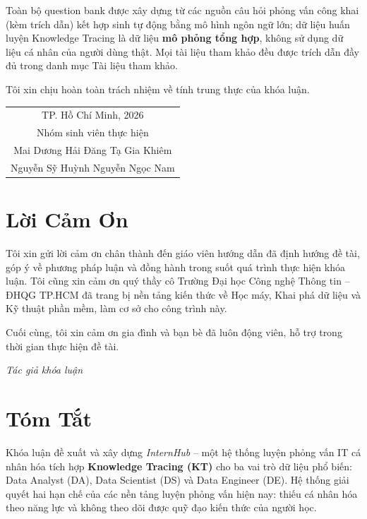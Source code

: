 \documentclass[12pt, a4paper]{report}
\newcommand{\system}{\textit{InternHub}}
\begin{document}
Toàn bộ question bank được xây dựng từ các nguồn câu hỏi phỏng vấn công khai (kèm trích dẫn) kết hợp sinh tự động bằng mô hình ngôn ngữ lớn; dữ liệu huấn luyện Knowledge Tracing là dữ liệu \textbf{mô phỏng tổng hợp}, không sử dụng dữ liệu cá nhân của người dùng thật. Mọi tài liệu tham khảo đều được trích dẫn đầy đủ trong danh mục Tài liệu tham khảo.

Tôi xin chịu hoàn toàn trách nhiệm về tính trung thực của khóa luận.

\vspace{1.5cm}
\hfill\begin{tabular}{c}
TP. Hồ Chí Minh, 2026 \\
Nhóm sinh viên thực hiện \\[2.5cm]
Mai Dương Hải Đăng \quad Tạ Gia Khiêm \\
Nguyễn Sỹ Huỳnh \quad Nguyễn Ngọc Nam \\
\end{tabular}

\chapter*{Lời Cảm Ơn}

Tôi xin gửi lời cảm ơn chân thành đến giáo viên hướng dẫn đã định hướng đề tài, góp ý về phương pháp luận và đồng hành trong suốt quá trình thực hiện khóa luận. Tôi cũng xin cảm ơn quý thầy cô Trường Đại học Công nghệ Thông tin -- ĐHQG TP.HCM đã trang bị nền tảng kiến thức về Học máy, Khai phá dữ liệu và Kỹ thuật phần mềm, làm cơ sở cho công trình này.

Cuối cùng, tôi xin cảm ơn gia đình và bạn bè đã luôn động viên, hỗ trợ trong thời gian thực hiện đề tài.

\vspace{0.5cm}
\hfill\textit{Tác giả khóa luận}

\chapter*{Tóm Tắt}

Khóa luận đề xuất và xây dựng \system{} -- một hệ thống luyện phỏng vấn IT cá nhân hóa tích hợp \textbf{Knowledge Tracing (KT)} cho ba vai trò dữ liệu phổ biến: Data Analyst (DA), Data Scientist (DS) và Data Engineer (DE). Hệ thống giải quyết hai hạn chế của các nền tảng luyện phỏng vấn hiện nay: thiếu cá nhân hóa theo năng lực và không theo dõi được quỹ đạo kiến thức của người học.
\end{document}

